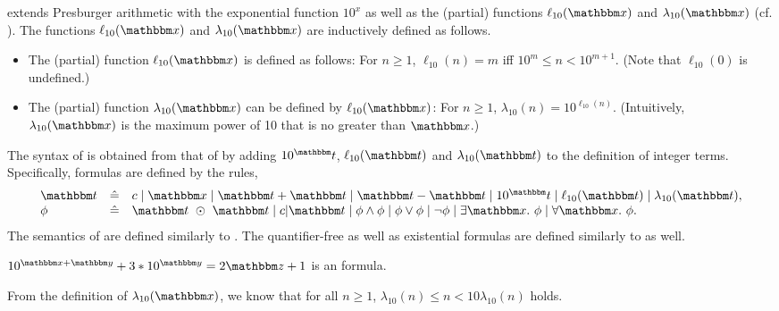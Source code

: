 {\paexp} extends Presburger arithmetic with the exponential function $10^x$ as well as the (partial) functions $\ell_{10}(\ivarx)$ and $\lambda_{10}(\ivarx)$ (cf. \cite{Point86}). The functions $\ell_{10}(\ivarx)$ and $\lambda_{10}(\ivarx)$ are inductively defined as follows.
\begin{itemize}
\item The (partial) function $\ell_{10}(\ivarx)$ is defined as follows: For $n \ge 1$, $\ell_{10}(n) = m$ iff $10^m \le n < 10^{m+1}$. (Note that $\ell_{10}(0)$ is undefined.) 
%
\item The (partial) function $\lambda_{10}(\ivarx)$ can be defined by $\ell_{10}(\ivarx)$: For $n \ge 1$, $\lambda_{10}(n) = 10^{\ell_{10}(n)}$. (Intuitively, $\lambda_{10}(\ivarx)$ is the maximum power of 10 that is no greater than $\ivarx$.)
\end{itemize}

The syntax of {\paexp} is obtained from that of {\pa} by adding $10^\iterm$, $\ell_{10}(\iterm)$ and $\lambda_{10}(\iterm)$ to the definition of integer terms. Specifically, {\paexp} formulas are defined by the rules,
%
 $$
 \begin{array}{ l c l}
 \iterm &\Def& c \mid \ivarx \mid \iterm + \iterm \mid \iterm - \iterm \mid 10^\iterm \mid \ell_{10}(\iterm) \mid \lambda_{10}(\iterm), \\
 \phi &\Def & \iterm \ \op\ \iterm \mid c | \iterm \mid \phi \wedge \phi \mid \phi \vee \phi \mid \neg \phi \mid \exists \ivarx.\ \phi \mid \forall \ivarx.\ \phi.
 \end{array}
 $$
 The semantics of {\paexp} are defined similarly to {\pa}. The quantifier-free as well as existential {\paexp} formulas are defined similarly to {\pa} as well.

\begin{example}
$10^{\ivarx+ \ivary} + 3 * 10^{\ivary}  = 2 \ivarz +1 $ is an {\paexp} formula.
\end{example} 
 
From the definition of $\lambda_{10}(\ivarx)$, we know that for all $n \ge 1$, $\lambda_{10}(n) \le n < 10\lambda_{10}(n)$ holds.


